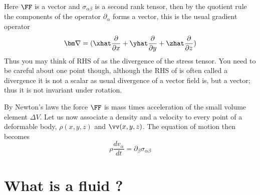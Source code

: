 %
Here $\FF$ is a vector and $\sigma_{\alpha\beta}$ is a second rank
tensor, then by the quotient rule the components of the operator
$\partial_{\alpha}$ forms a vector, this is the usual gradient
operator 
\begin{equation}
{\bm \nabla} = (\xhat\frac{\partial}{\partial x}+\yhat\frac{\partial}{\partial y}+\zhat\frac{\partial}{\partial z} ) 
\end{equation}
Thus you may think of RHS of  as the divergence of the
stress tensor. You need to be careful about one point though, although
the RHS of  is often called a divergence it is not a
scalar as usual divergence of a vector field is, but a vector; thus it
is not invariant under rotation. 

By Newton's laws the force $\FF$ is mass times acceleration of the
small volume element $\Delta V$. Let us now associate a density and a
velocity to every point of a deformable body, $\rho(x,y,z)$ and 
$\vv(x,y,z)$.  The equation of motion then becomes
\begin{equation}
\boxed{
\rho\frac{dv_{\alpha}}{dt} = \partial_{\beta}\sigma_{\alpha\beta}
}
\label{A1.2:motion}
\end{equation}

\section{What is a fluid ?}

